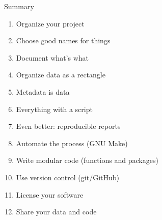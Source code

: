 \documentclass[aspectratio=169,12pt,t]{beamer}
\begin{document}
\begin{frame}[c]{Summary}

  \begin{enumerate}
  \item Organize your project
  \item Choose good names for things
  \item Document what's what
  \item Organize data as a rectangle
  \item Metadata is data
  \item Everything with a script
  \item Even better: reproducible reports
  \item Automate the process {\lolit (GNU Make)}
  \item Write modular code {\lolit (functions and packages)}
  \item Use version control {\lolit (git/GitHub)}
  \item License your software
  \item Share your data and code
  \end{enumerate}


\end{frame}
\end{document}
